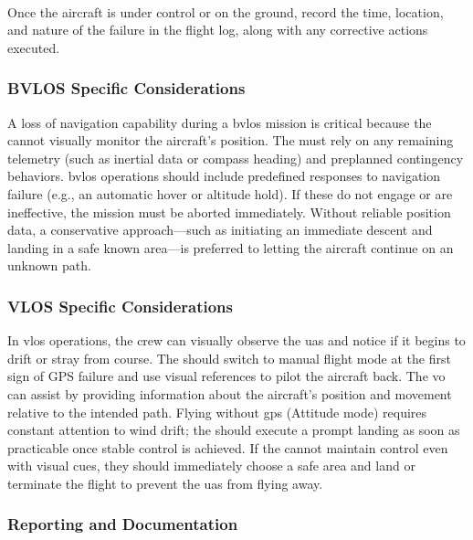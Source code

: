                 \paragraph{} Once the aircraft is under control or on the ground, record the time, location, and nature of the failure in the flight log, along with any corrective actions executed.
             
            \subsubsection{BVLOS Specific Considerations} A loss of navigation capability during a \ac{bvlos} mission is critical because the  cannot visually monitor the aircraft’s position. The  must rely on any remaining telemetry (such as inertial data or compass heading) and preplanned contingency behaviors. \ac{bvlos} operations should include predefined responses to navigation failure (e.g., an automatic hover or altitude hold). If these do not engage or are ineffective, the mission must be aborted immediately. Without reliable position data, a conservative approach—such as initiating an immediate descent and landing in a safe known area—is preferred to letting the aircraft continue on an unknown path.
 
            \subsubsection{VLOS Specific Considerations} In \ac{vlos} operations, the crew can visually observe the \ac{uas} and notice if it begins to drift or stray from course. The  should switch to manual flight mode at the first sign of GPS failure and use visual references to pilot the aircraft back. The \ac{vo} can assist by providing information about the aircraft’s position and movement relative to the intended path. Flying without \ac{gps} (Attitude mode) requires constant attention to wind drift; the  should execute a prompt landing as soon as practicable once stable control is achieved. If the  cannot maintain control even with visual cues, they should immediately choose a safe area and land or terminate the flight to prevent the \ac{uas} from flying away.
            
            \subsubsection{Reporting and Documentation}

